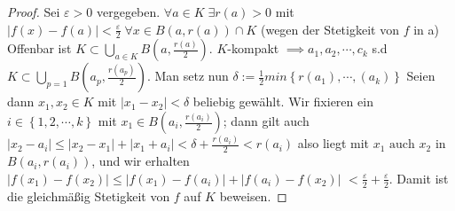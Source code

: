 \begin{proof}
	Sei $ \varepsilon > 0 $ vergegeben. $ \forall a \in  K \; \exists r(a)>0$  mit 
	$ \left| f(x) - f(a) \right| < \frac{ \varepsilon }{2} \; \forall x \in  B(a, r(a)) \cap K $
	(wegen der Stetigkeit von $ f $  in a) Offenbar ist $ K \subset \bigcup\limits_{a \in K}^{} 
	B(a,\frac{r(a)}{2} ) $. $ K $-kompakt $ \implies a_1, a_2, \cdots , c_{k} $ s.d $   K \subset 
	\bigcup\limits_{p = 1}^{} B \left( a_{p}, \frac{r \left( a_{p} \right) }{2}  \right) $.
	Man setz nun $ \delta := \frac{1}{2} min \left\{ r \left( a_{1} \right), \cdots, 
	\left( a_{k} \right) \right\}   $ Seien dann $ x_{1}, x_{2} \in K $ mit 
	$ \left| x_1-x_2 \right|  < \delta $ beliebig gewählt. Wir fixieren ein
	$ i \in  \left\{1,2,\cdots , k  \right\}  $  mit $ x_1 \in  B \left( a_{i},
	\frac{r \left( a_{i} \right) }{2}  \right)  $; dann gilt auch $ \left| x_2 - a_{i} \right| 
	\leq \left| x_2 - x_1 \right| + \left| x_{1}  + a_{i}\right| 
	< \delta + \frac{r(a_i)}{2} < r(a_i) $
	also liegt mit $ x_1 \text{ auch }  x_2 $ in $ B(a_{i}, r \left( a_{i} \right))
	$, und wir erhalten $ \left| f \left( x_1 \right) - f \left( x_2 \right)  \right| \leq 
	\left| f \left( x_1 \right) - f \left( a_{i} \right)   \right| + \left| f \left( a_{i} \right) 
	- f \left( x_2 \right) \right| $ $ < \frac{ \varepsilon }{2} + \frac{ \varepsilon }{2}  $.
	Damit ist die gleichmäßig Stetigkeit von $ f $ auf $ K $ beweisen.
\end{proof}
